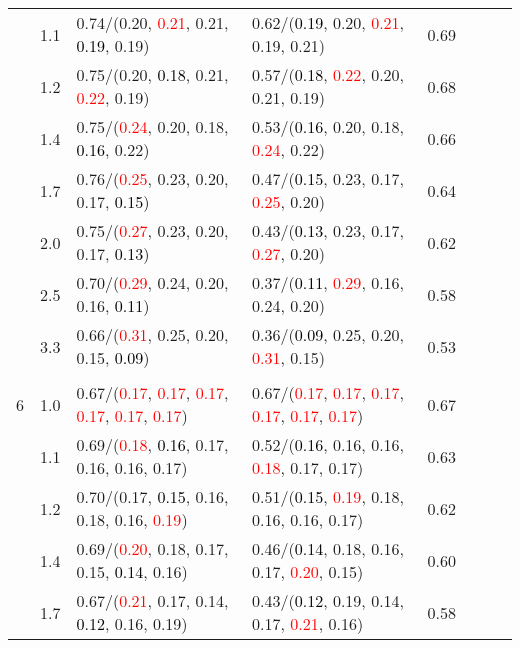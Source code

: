 \documentclass[10pt,a4paper]{report}
\begin{document}
\begin{table}[!htbp]
\begin{center}
{\begin{tabular}{ccllcccc}
			&1.1&0.74/(0.20, \textcolor{red}{0.21}, 0.21, \textcolor{black}{0.19}, 0.19)&0.62/(\textcolor{black}{0.19}, 0.20, \textcolor{red}{0.21}, 0.19, 0.21)&0.69\\
			&1.2&0.75/(0.20, \textcolor{black}{0.18}, 0.21, \textcolor{red}{0.22}, 0.19)&0.57/(\textcolor{black}{0.18}, \textcolor{red}{0.22}, 0.20, 0.21, 0.19)&0.68\\
			&1.4&0.75/(\textcolor{red}{0.24}, 0.20, 0.18, \textcolor{black}{0.16}, 0.22)&0.53/(\textcolor{black}{0.16}, 0.20, 0.18, \textcolor{red}{0.24}, 0.22)&0.66\\
			&1.7&0.76/(\textcolor{red}{0.25}, 0.23, 0.20, 0.17, \textcolor{black}{0.15})&0.47/(\textcolor{black}{0.15}, 0.23, 0.17, \textcolor{red}{0.25}, 0.20)&0.64\\
			&2.0&0.75/(\textcolor{red}{0.27}, 0.23, 0.20, 0.17, \textcolor{black}{0.13})&0.43/(\textcolor{black}{0.13}, 0.23, 0.17, \textcolor{red}{0.27}, 0.20)&0.62\\
			&2.5&0.70/(\textcolor{red}{0.29}, 0.24, 0.20, 0.16, \textcolor{black}{0.11})&0.37/(\textcolor{black}{0.11}, \textcolor{red}{0.29}, 0.16, 0.24, 0.20)&0.58\\
			&3.3&0.66/(\textcolor{red}{0.31}, 0.25, 0.20, 0.15, \textcolor{black}{0.09})&0.36/(\textcolor{black}{0.09}, 0.25, 0.20, \textcolor{red}{0.31}, 0.15)&0.53\\
			&&&&\\
			6			&1.0&0.67/(\textcolor{red}{0.17}, \textcolor{red}{0.17}, \textcolor{red}{0.17}, \textcolor{red}{0.17}, \textcolor{red}{0.17}, \textcolor{red}{0.17})&0.67/(\textcolor{red}{0.17}, \textcolor{red}{0.17}, \textcolor{red}{0.17}, \textcolor{red}{0.17}, \textcolor{red}{0.17}, \textcolor{red}{0.17})&0.67\\
			&1.1&0.69/(\textcolor{red}{0.18}, \textcolor{black}{0.16}, 0.17, 0.16, 0.16, 0.17)&0.52/(\textcolor{black}{0.16}, 0.16, 0.16, \textcolor{red}{0.18}, 0.17, 0.17)&0.63\\
			&1.2&0.70/(0.17, \textcolor{black}{0.15}, 0.16, 0.18, 0.16, \textcolor{red}{0.19})&0.51/(\textcolor{black}{0.15}, \textcolor{red}{0.19}, 0.18, 0.16, 0.16, 0.17)&0.62\\
			&1.4&0.69/(\textcolor{red}{0.20}, 0.18, 0.17, 0.15, \textcolor{black}{0.14}, 0.16)&0.46/(\textcolor{black}{0.14}, 0.18, 0.16, 0.17, \textcolor{red}{0.20}, 0.15)&0.60\\
			&1.7&0.67/(\textcolor{red}{0.21}, 0.17, 0.14, \textcolor{black}{0.12}, 0.16, 0.19)&0.43/(\textcolor{black}{0.12}, 0.19, 0.14, 0.17, \textcolor{red}{0.21}, 0.16)&0.58\\

\end{tabular}}
\end{center}
\end{table}
\end{document}
